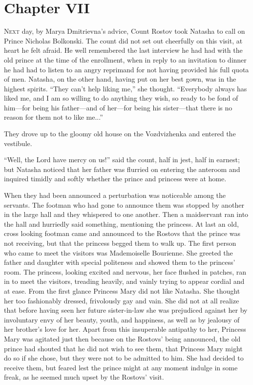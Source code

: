 \chapter*{Chapter VII}
\ifaudio     
{} 
\fi

\lettrine[lines=2, loversize=0.3, lraise=0]{\initfamily N}{ext}
day, by Marya Dmitrievna's advice, Count Rostov took Natasha
to call on Prince Nicholas Bolkonski. The count did not set out
cheerfully on this visit, at heart he felt afraid. He well
remembered the last interview he had had with the old prince at
the time of the enrollment, when in reply to an invitation to
dinner he had had to listen to an angry reprimand for not having
provided his full quota of men. Natasha, on the other hand,
having put on her best gown, was in the highest spirits. ``They
can't help liking me,'' she thought. ``Everybody always has liked
me, and I am so willing to do anything they wish, so ready to be
fond of him---for being his father---and of her---for being his
sister---that there is no reason for them not to like me...''

They drove up to the gloomy old house on the Vozdvizhenka and
entered the vestibule.

``Well, the Lord have mercy on us!'' said the count, half in
jest, half in earnest; but Natasha noticed that her father was
flurried on entering the anteroom and inquired timidly and softly
whether the prince and princess were at home.

When they had been announced a perturbation was noticeable among
the servants. The footman who had gone to announce them was
stopped by another in the large hall and they whispered to one
another. Then a maidservant ran into the hall and hurriedly said
something, mentioning the princess. At last an old, cross looking
footman came and announced to the Rostovs that the prince was not
receiving, but that the princess begged them to walk up. The
first person who came to meet the visitors was Mademoiselle
Bourienne. She greeted the father and daughter with special
politeness and showed them to the princess' room. The princess,
looking excited and nervous, her face flushed in patches, ran in
to meet the visitors, treading heavily, and vainly trying to
appear cordial and at ease. From the first glance Princess Mary
did not like Natasha. She thought her too fashionably dressed,
frivolously gay and vain. She did not at all realize that before
having seen her future sister-in-law she was prejudiced against
her by involuntary envy of her beauty, youth, and happiness, as
well as by jealousy of her brother's love for her. Apart from
this insuperable antipathy to her, Princess Mary was agitated
just then because on the Rostovs' being announced, the old prince
had shouted that he did not wish to see them, that Princess Mary
might do so if she chose, but they were not to be admitted to
him. She had decided to receive them, but feared lest the prince
might at any moment indulge in some freak, as he seemed much
upset by the Rostovs' visit.

